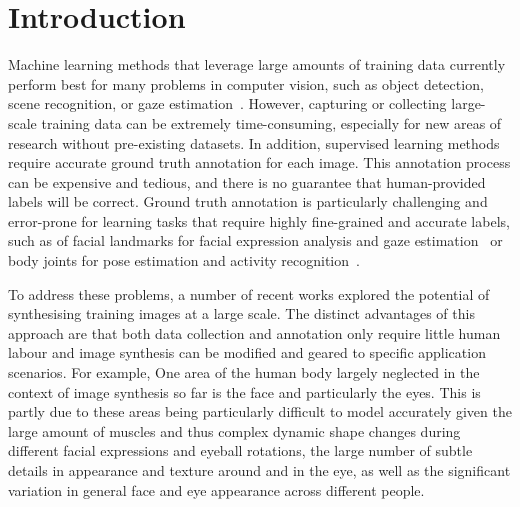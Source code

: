 
\section{Introduction}

Machine learning methods that leverage large amounts of training data currently perform best for many problems in computer vision, such as object detection, scene recognition, or gaze estimation~\cite{zhou2014learning,girshick2014rich,zhang15_cvpr}.
However, capturing or collecting large-scale training data can be extremely time-consuming, especially for new areas of research without pre-existing datasets.
In addition, supervised learning methods require accurate ground truth annotation for each image.
This annotation process can be expensive and tedious, and there is no guarantee that human-provided labels will be correct.
Ground truth annotation is particularly challenging and error-prone for learning tasks that require highly fine-grained and accurate labels, such as of facial landmarks for facial expression analysis and gaze estimation~ or body joints for pose estimation and activity recognition~.

To address these problems, a number of recent works explored the potential of synthesising training images at a large scale.
The distinct advantages of this approach are that both data collection and annotation only require little human labour and image synthesis can be modified and geared to specific application scenarios.
For example, 
One area of the human body largely neglected in the context of image synthesis so far is the face and particularly the eyes.
This is partly due to these areas being particularly difficult to model accurately given the large amount of muscles and thus complex dynamic shape changes during different facial expressions and eyeball rotations, the large number of subtle details in appearance and texture around and in the eye, as well as the significant variation in general face and eye appearance across different people.


